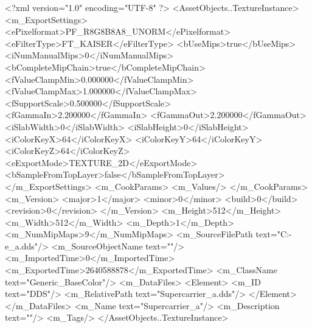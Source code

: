 <?xml version="1.0" encoding="UTF-8" ?>
<AssetObjects..TextureInstance>
	<m_ExportSettings>
		<ePixelformat>PF_R8G8B8A8_UNORM</ePixelformat>
		<eFilterType>FT_KAISER</eFilterType>
		<bUseMips>true</bUseMips>
		<iNumManualMips>0</iNumManualMips>
		<bCompleteMipChain>true</bCompleteMipChain>
		<fValueClampMin>0.000000</fValueClampMin>
		<fValueClampMax>1.000000</fValueClampMax>
		<fSupportScale>0.500000</fSupportScale>
		<fGammaIn>2.200000</fGammaIn>
		<fGammaOut>2.200000</fGammaOut>
		<iSlabWidth>0</iSlabWidth>
		<iSlabHeight>0</iSlabHeight>
		<iColorKeyX>64</iColorKeyX>
		<iColorKeyY>64</iColorKeyY>
		<iColorKeyZ>64</iColorKeyZ>
		<eExportMode>TEXTURE_2D</eExportMode>
		<bSampleFromTopLayer>false</bSampleFromTopLayer>
	</m_ExportSettings>
	<m_CookParams>
		<m_Values/>
	</m_CookParams>
	<m_Version>
		<major>1</major>
		<minor>0</minor>
		<build>0</build>
		<revision>0</revision>
	</m_Version>
	<m_Height>512</m_Height>
	<m_Width>512</m_Width>
	<m_Depth>1</m_Depth>
	<m_NumMipMaps>9</m_NumMipMaps>
	<m_SourceFilePath text="C:\Users\Deo-e\Desktop\Supercarrier_a.dds"/>
	<m_SourceObjectName text=""/>
	<m_ImportedTime>0</m_ImportedTime>
	<m_ExportedTime>2640588878</m_ExportedTime>
	<m_ClassName text="Generic_BaseColor"/>
	<m_DataFiles>
		<Element>
			<m_ID text="DDS"/>
			<m_RelativePath text="Supercarrier_a.dds"/>
		</Element>
	</m_DataFiles>
	<m_Name text="Supercarrier_a"/>
	<m_Description text=""/>
	<m_Tags/>
</AssetObjects..TextureInstance>

